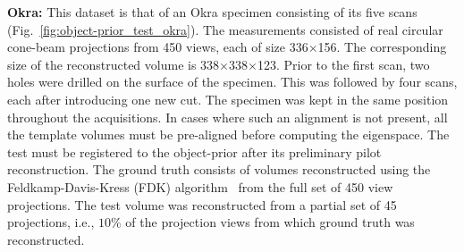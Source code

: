 \documentclass[journal]{IEEEtran}
\begin{document}
 \textbf{Okra:} This dataset is that of an Okra specimen consisting of its five
scans (Fig.~\ref{fig:object-prior_test_okra}). The measurements
consisted of real circular cone-beam projections from 450 views, each of size
336$\times$156. The corresponding size of the reconstructed volume is
338$\times$338$\times$123. Prior to the first scan, two holes were
drilled on the surface of the specimen. This was followed by four
scans, each after introducing one new cut. The specimen was kept in
the same position throughout the acquisitions. In cases where such an
alignment is not present, all the template volumes must be pre-aligned
before computing the eigenspace. The test must be registered to the
object-prior after its preliminary pilot reconstruction. The ground
truth consists of volumes reconstructed using the Feldkamp-Davis-Kress
(FDK) algorithm~\cite{FDK} from the full set of 450 view
projections. The test volume was reconstructed from a partial set of
45 projections, i.e., $10\%$ of the projection views from which ground
truth was reconstructed.\\
\end{document}

